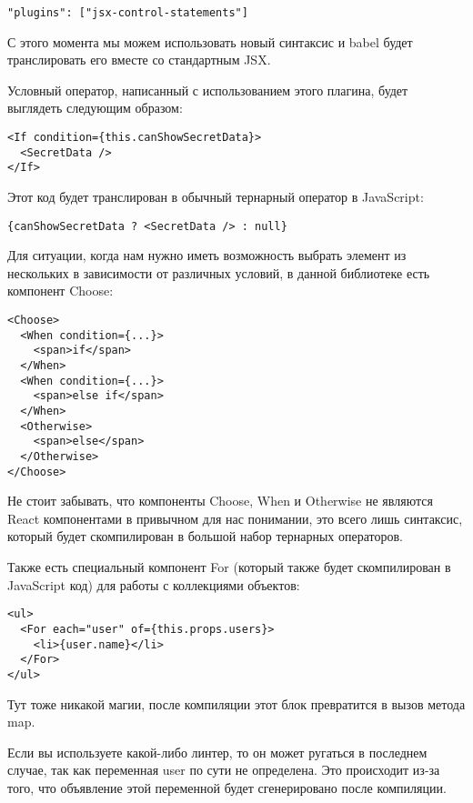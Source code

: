 \begin{lstlisting}
"plugins": ["jsx-control-statements"]
\end{lstlisting}

С этого момента мы можем использовать новый синтаксис и babel будет транслировать его вместе со стандартным JSX.

Условный оператор, написанный с использованием этого плагина, будет выглядеть следующим образом:

\begin{lstlisting}
<If condition={this.canShowSecretData}>
  <SecretData />
</If>
\end{lstlisting}

Этот код будет транслирован в обычный тернарный оператор в JavaScript:

\begin{lstlisting}
{canShowSecretData ? <SecretData /> : null}
\end{lstlisting}

Для ситуации, когда нам нужно иметь возможность выбрать элемент из нескольких в зависимости от различных условий, в данной библиотеке есть компонент Choose:

\begin{lstlisting}
<Choose>
  <When condition={...}>
    <span>if</span>
  </When>
  <When condition={...}>
    <span>else if</span>
  </When>
  <Otherwise>
    <span>else</span>
  </Otherwise>
</Choose>
\end{lstlisting}

Не стоит забывать, что компоненты Choose, When и Otherwise не являются React компонентами в привычном для нас понимании, это всего лишь синтаксис, который будет скомпилирован в большой набор тернарных операторов.

Также есть специальный компонент For (который также будет скомпилирован в JavaScript код) для работы с коллекциями объектов:

\begin{lstlisting}
<ul>
  <For each="user" of={this.props.users}>
    <li>{user.name}</li>
  </For>
</ul>
\end{lstlisting}

Тут тоже никакой магии, после компиляции этот блок превратится в вызов метода map.

Если вы используете какой-либо линтер, то он может ругаться в последнем случае, так как переменная user по сути не определена. Это происходит из-за того, что объявление этой переменной будет сгенерировано после компиляции.

